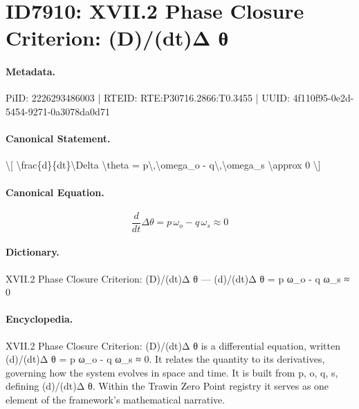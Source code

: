 \section*{ID7910: XVII.2 Phase Closure Criterion: (D)/(dt)Δ θ}
\paragraph{Metadata.}
PiID: 2226293486003 | RTEID: RTE:P30716.2866:T0.3455 | UUID: 4f110f95-0e2d-5454-9271-0a3078da0d71

\paragraph{Canonical Statement.}
\textbackslash{}[ \textbackslash{}frac\{d\}\{dt\}\textbackslash{}Delta \textbackslash{}theta = p\textbackslash{},\textbackslash{}omega\_o - q\textbackslash{},\textbackslash{}omega\_s \textbackslash{}approx 0 \textbackslash{}]

\paragraph{Canonical Equation.}
\[
\frac{d}{dt}\Delta \theta = p\,\omega_o - q\,\omega_s \approx 0
\]

\paragraph{Dictionary.}
XVII.2 Phase Closure Criterion: (D)/(dt)Δ θ — (d)/(dt)Δ θ = p ω\_o - q ω\_s ≈ 0

\paragraph{Encyclopedia.}
XVII.2 Phase Closure Criterion: (D)/(dt)Δ θ is a differential equation, written (d)/(dt)Δ θ = p ω\_o - q ω\_s ≈ 0. It relates the quantity to its derivatives, governing how the system evolves in space and time. It is built from p, o, q, s, defining (d)/(dt)Δ θ. Within the Trawin Zero Point registry it serves as one element of the framework's mathematical narrative.
